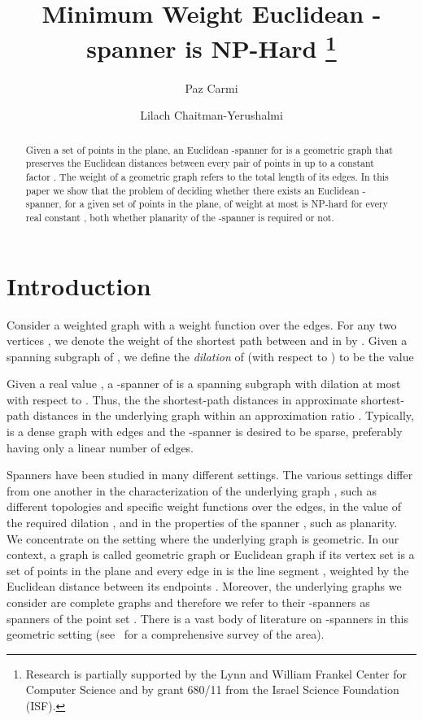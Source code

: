 \documentclass[a4paper]{llncs}
\title{ Minimum Weight Euclidean -spanner is NP-Hard
\thanks{Research is partially supported by the Lynn and William Frankel
Center for Computer Science and by
grant 680/11 from the Israel Science Foundation (ISF). }}
\author{Paz Carmi \and Lilach Chaitman-Yerushalmi}
\institute{ Department of Computer Science,\\ Ben-Gurion University of the Negev, Israel}
\begin{document}
\maketitle



\begin{abstract}

Given a set  of points in the plane, an Euclidean -spanner for  is a 
geometric graph that preserves the Euclidean distances between 
every pair of points in  up to a constant factor .
The weight of a geometric graph refers to the total length of its edges.
In this paper we show that the problem of deciding whether there exists 
an Euclidean -spanner, for a given set of points in the plane, of weight at most  is NP-hard
for every real constant , both whether planarity of the -spanner is required or not. 
 

\end{abstract}

\section{Introduction}\label{sec:Intro}



Consider a weighted graph  with a weight function  over the edges.
For any two vertices , we denote the weight of the shortest path between  and  in  by .
Given a spanning subgraph  of , we define the \emph{dilation} of  (with respect to ) to be the value

Given a real value , a -spanner of  is a spanning subgraph  
with dilation at most  with respect to .
Thus, the the shortest-path distances in  approximate shortest-path distances
in the underlying graph  within an approximation ratio .
Typically,  is a dense graph with  edges and 
the -spanner  is desired to be sparse, preferably having only a linear number
of edges.



Spanners have been studied in many different settings. 
The various settings differ from one another in the characterization of the underlying graph ,
such as different topologies and specific weight functions over the edges,  
in the value of the required dilation , and in the properties of the spanner , such as planarity.
We concentrate on the setting where the underlying graph is geometric.
In our context, a graph  is called geometric graph or Euclidean graph
if its vertex set  is a set of points in the plane 
and every edge  in  is the line segment , 
weighted by the Euclidean distance between its endpoints .
Moreover, the underlying graphs we consider are complete graphs
and therefore we refer to their -spanners as spanners of the point set .
There is a vast body of literature on -spanners in this geometric setting 
(see~\cite{GiriSmid07} for a comprehensive survey of the area).
\end{document}

